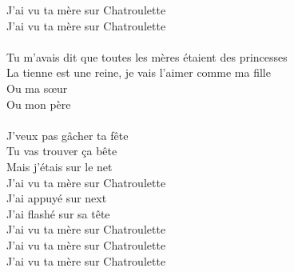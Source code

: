 J'ai vu ta mère sur Chatroulette\\
J'ai vu ta mère sur Chatroulette\\\\
Tu m'avais dit que toutes les mères étaient des princesses\\
La tienne est une reine, je vais l'aimer comme ma fille\\
Ou ma sœur\\
Ou mon père\\\\
J'veux pas gâcher ta fête\\
Tu vas trouver ça bête\\
Mais j'étais sur le net\\
J'ai vu ta mère sur Chatroulette\\
J'ai appuyé sur next\\
J'ai flashé sur sa tête\\
J'ai vu ta mère sur Chatroulette\\
J'ai vu ta mère sur Chatroulette\\
J'ai vu ta mère sur Chatroulette\\
